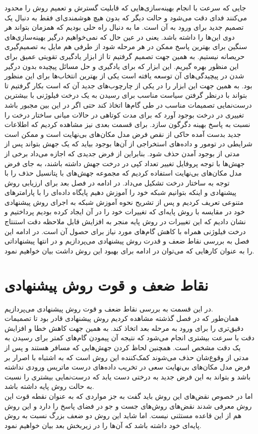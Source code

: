 جایی که سرعت با انجام بهینه‌سازی‌هایی که قابلیت گسترش و تعمیم روش را محدود می‌کنند فدای دقت می‌شود و حالت دیگر که بدون هیچ هوشمند‌ی‌ای فقط به دنبال یک تصمیم جدید برای ورود به آن است. ما به دنبال راه حلی بودیم که همزمان بتواند هر دوی این‌ها را داشته باشد. یعنی در عین حال که نمی‌خواهیم درگیر بهینه‌سازی‌های سنگین برای بهترین پاسخ ممکن در هر مرحله شود از طرفی هم مایل به تصمیم‌گیری حریصانه نیستیم. به همین جهت تصمیم گرفتیم تا از ابزار یادگیری تقویتی عمیق برای این منظور بهره گیریم. این ابزار که برای یادگیری و حل مسائل پیچیده بدون درگیر شدن در پیچیدگی‌های آن توسعه یافته است یکی از بهترین انتخاب‌ها برای این منظور بود. به همین جهت این ابزار را در یکی از چارچوب‌های جدید آن که است بکار گرفتیم تا بتواند با درنظر گرفتن سیاست مناسب برای رسیدن به یک درخت فیلوژنی با بیشترین درست‌نمایی تصمیمات مناسب در طی گام‌ها اتخاذ کند حتی اگر در این بین مجبور باشد تغییری در درخت بوجود آورد که برای مدت کوتاهی در حالات میانی ساختار درخت را نسبت به پاسخ بهینه دگرگون سازد. برای قسمت بعدی نیز مشاهده کردیم که اطلاعات جدید بدست آمده حاکی از نقص فرض مدل مکان‌های بی‌نهایت است و ممکن است شرایطی در تومور و داده‌های استخراجی از آن‌ها بوجود بیاید که یک جهش بتواند پس از مدتی از بوجود آمدن حذف شود. بنابراین از فرض جدیدی که اجازه می‌داد برخی از جهش‌ها با توجه پروفایل تغییر تعداد کپی در درخت جهش داشته باشند، به جای فرض مدل مکان‌های بی‌نهایت استفاده کردیم که مجموعه جهش‌های با پتانسیل حذف را با توجه به ساختار درخت تشکیل می‌داد. در ادامه در فصل بعد برای ارزیابی روش پیشنهادی و اینکه بتوانیم شبکه خود را آموزش دهیم پایگاه داده‌ای را با پارامترهای متنوعی تعریف کردیم و پس از تشریح نحوه آموزش شبکه به اجرای روش پیشنهادی خود در مقایسه با روش پایه‌ای که تغییرات خود را در آن ایجاد کرده بودیم پرداختیم و نشان دادیم که این تغییرات در روش پایه منجر به افزایش قابل ملاحظه دقت استنتاج درخت فیلوژنی همراه با کاهش گام‌های مورد نیاز برای حصول آن است.
  در ادامه این فصل به بررسی نقاط ضعف و قدرت روش پیشنهادی می‌پردازیم و در انتها پیشنهاداتی را به عنوان کارهایی که می‌توان در ادامه برای بهبود این روش داشت بیان خواهیم نمود.
  
\section{نقاط ضعف و قوت روش پیشنهادی}
  در این قسمت به بررسی نقاط ضعف و قوت روش پیشنهادی می‌پردازیم.
  \\
  همان‌طور که در فصل گذشته مشاهده کردیم روش پیشنهادی قادر بود تا تصمیمات دقیق‌تری را برای ورود به مرحله بعد اتخاذ کند. به همین جهت کاهش خطا و افزایش دقت با سرعت بیشتری انجام می‌شود که نتیجه آن پیمودن گام‌های کمتر برای رسیدن به یک دقت مشخص است. همچنین لحاظ کردن جهش‌هایی که مسافر هستند و پس از مدتی از وقوع‌شان حذف می‌شوند کمک‌کننده این روش است که به اشتباه با اصرار بر فرض مدل مکان‌های بی‌نهایت سعی در تخریب داده‌های درست ماتریس ورودی نداشته باشد و بتواند به این فرض جدید به درختی دست یابد که درست‌نمایی بیشتری را نسبت به حالت روش پایه داشته باشد.
  \\
  اما در خصوص نقض‌های این روش باید گفت به جز مواردی که به عنوان نقطه قوت این روش معرفی شدند نقض‌های روش‌های جست و جو در فضای پاسخ را دارد و این روش هم از این قاعده مستثنی نیست. اما شاید این روش دو ضعف بزرگ نسبت به روش پایه‌ای خود داشته باشد که آن‌ها را در زیربخش بعد بیان خواهیم نمود.

